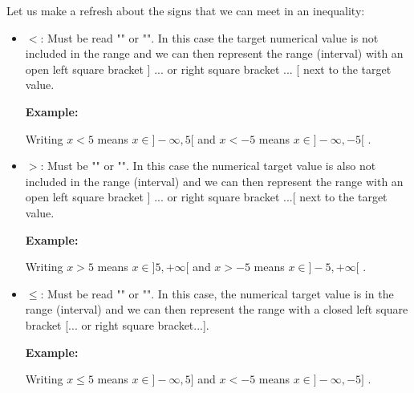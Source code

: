 	Let us make a refresh about the signs that we can meet in an inequality:
	\begin{itemize}
		\item $<$: Must be read "" or "". In this case the target numerical value is not included in the range and we can then represent the range (interval) with an open left square bracket ] ... or right square bracket ... [ next to the target value.
	\begin{tcolorbox}[colframe=black,colback=white,sharp corners]
	\textbf{{\Large {}}Example:}\\
	\begin{flushleft}
	Writing $x<5$ means $x \in ]-\infty,5[$ and $x<-5$ means $x \in ]-\infty,-5[$ .
	\end{flushleft}
	\end{tcolorbox}
	\item $>$: Must be "" or "". In this case the numerical target value is also not included in the range (interval) and we can then represent the range with an open left square bracket ] ... or right square bracket ...[  next to the target value.
	\begin{tcolorbox}[colframe=black,colback=white,sharp corners]
\textbf{{\Large {}}Example:}\\
	\begin{flushleft}
	Writing $x>5$ means $x \in ]5,+\infty[$ and $x>-5$ means $x \in ]-5,+\infty[$ .
	\end{flushleft}
	\end{tcolorbox}
	\item $\leq$: Must be read "" or "". In this case, the numerical target value is in the range (interval) and we can then represent the range  with a closed left square bracket [... or right square bracket...].
	\begin{tcolorbox}[colframe=black,colback=white,sharp corners]
\textbf{{\Large {}}Example:}\\
	\begin{flushleft}
	Writing $x\leq 5$ means $x \in ]-\infty,5]$ and $x<-5$ means $x \in ]-\infty,-5]$ .
	\end{flushleft}
	\end{tcolorbox}

\end{itemize}
